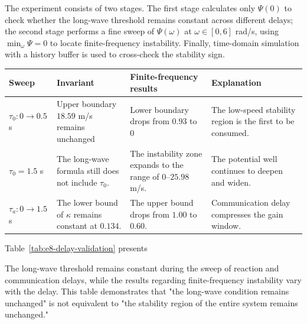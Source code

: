 \documentclass[11pt,a4paper,openany]{book}
\numberwithin{equation}{chapter}
\numberwithin{figure}{chapter}
\numberwithin{table}{chapter}
\newcommand{\tabletext}[2]{%
  \par\smallskip\noindent
  Table~\ref{#1} presents #2
\par\smallskip
}
\begin{document}
The experiment consists of two stages. The first stage calculates only $\Psi(0)$ to check whether the long-wave threshold remains constant across different delays; the second stage performs a fine sweep of $\Psi(\omega)$ at $\omega\in[0,6]$ rad/s, using $\min_\omega\Psi=0$ to locate finite-frequency instability. Finally, time-domain simulation with a history buffer is used to cross-check the stability sign.



\begin{center}
\small
{}
\label{tab:e8-delay-validation}
\begin{tabular}{p{3.2cm}p{3.4cm}p{3.7cm}p{3.2cm}}
\toprule
\textbf{Sweep} & \textbf{Invariant} & \textbf{Finite-frequency results} & \textbf{Explanation} \\
\midrule
$\tau_0:0\to0.5$ s &

Upper boundary $18.59$ m/s remains unchanged

&

Lower boundary drops from $0.93$ to $0$&The low-speed stability region is the first to be consumed.
\\[3pt]
$\tau_0=1.5$ s &

The long-wave formula still does not include $\tau_0$.

&

The instability zone expands to the range of $0$–$25.98$ m/s.

&

The potential well continues to deepen and widen.
\\[3pt]
$\tau_a:0\to1.5$ s &

The lower bound of $\kappa$ remains constant at $0.134$.

&

The upper bound drops from $1.00$ to $0.60$.

&

Communication delay compresses the gain window.
\\
\bottomrule
\end{tabular}
\end{center}
\tabletext{tab:e8-delay-validation}{

The long-wave threshold remains constant during the sweep of reaction and communication delays, while the results regarding finite-frequency instability vary with the delay. This table demonstrates that "the long-wave condition remains unchanged" is not equivalent to "the stability region of the entire system remains unchanged."
}
\end{document}
